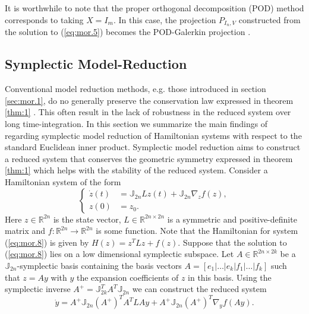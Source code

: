 It is worthwhile to note that the proper orthogonal decomposition (POD) method \cite{hesthaven2015certified} corresponds to taking $X = I_m$. In this case, the projection $P_{I_n,V}$ constructed from the solution to (\ref{eq:mor.5}) becomes the POD-Galerkin projection \cite{hesthaven2015certified}.

\subsection{Symplectic Model-Reduction} \label{sec:mor.2}
Conventional model reduction methods, e.g. those introduced in section \ref{sec:mor.1}, do no generally preserve the conservation law expressed in theorem \ref{thm:1} . This often result in the lack of robustness in the reduced system over long time-integration. In this section we summarize the main findings of \cite{doi:10.1137/17M1111991} regarding symplectic model reduction of Hamiltonian systems with respect to the standard Euclidean inner product. Symplectic model reduction aims to construct a reduced system that conserves the geometric symmetry expressed in theorem \ref{thm:1} which helps with the stability of the reduced system.
Consider a Hamiltonian system of the form
\begin{equation} \label{eq:mor.8}
\left\{
\begin{aligned}
	\dot z(t) &= \mathbb J_{2n} L z(t) + \mathbb J_{2n} \nabla_z f(z), \\
	z(0) &= z_0.
\end{aligned}
\right.
\end{equation}
Here $z\in \mathbb R^{2n}$ is the state vector, $L\in\mathbb R^{2n\times 2n}$ is a symmetric and positive-definite matrix and $f:\mathbb R^{2n}\to\mathbb R^{2n}$ is some function. Note that the Hamiltonian for system (\ref{eq:mor.8}) is given by $H(z) = z^TLz + f(z)$. Suppose that the solution to (\ref{eq:mor.8}) lies on a low dimensional symplectic subspace. Let $A\in \mathbb{R}^{2n\times 2k}$ be a $\mathbb{J}_{2n}$-symplectic basis containing the basis vectors $A=[e_1|\dots|e_k|f_1|\dots|f_k]$ such that $z = Ay$ with $y$ the expansion coefficients of $z$ in this basis. Using the symplectic inverse $A^+ = \mathbb J_{2k}^T A^T \mathbb J_{2n}$ we can construct the reduced system
\begin{equation} \label{eq:mor.9}
	\dot y = A^+ \mathbb J_{2n} (A^+)^T A^T L A y + A^+ \mathbb J_{2n} (A^+)^T \nabla_y f(Ay).
\end{equation}
